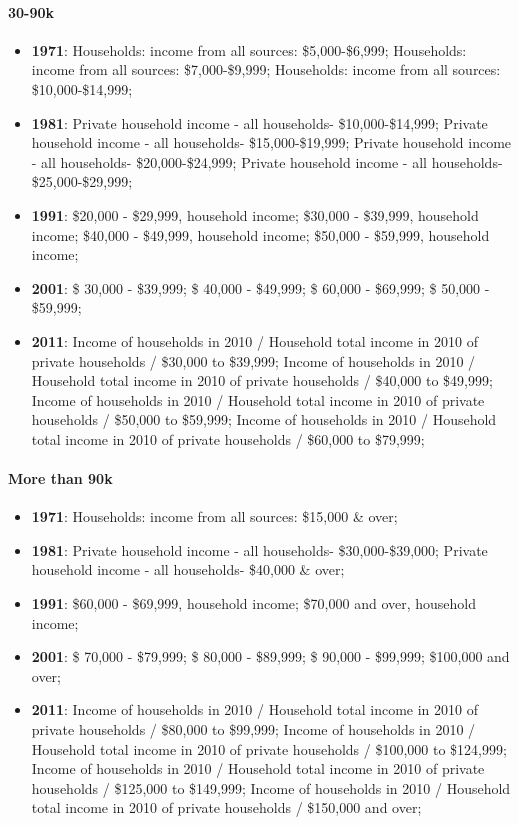 \documentclass[a4paper]{article}
\begin{document}
\paragraph{30-90k}
\begin{itemize}
   \item{\textbf{1971}:  Households: income from all sources: \$5,000-\$6,999; Households: income from all sources: \$7,000-\$9,999; Households: income from all sources: \$10,000-\$14,999;}
   \item{\textbf{1981}:  Private household income - all households- \$10,000-\$14,999; Private household income - all households- \$15,000-\$19,999; Private household income - all households- \$20,000-\$24,999; Private household income - all households- \$25,000-\$29,999;}
   \item{\textbf{1991}:  \$20,000 - \$29,999, household income; \$30,000 - \$39,999, household income; \$40,000 - \$49,999, household income; \$50,000 - \$59,999, household income;}
   \item{\textbf{2001}:  \$ 30,000 - \$39,999; \$ 40,000 - \$49,999; \$ 60,000 - \$69,999; \$ 50,000 - \$59,999;}
   \item{\textbf{2011}:  Income of households in 2010 / Household total income in 2010 of private households / \$30,000 to \$39,999; Income of households in 2010 / Household total income in 2010 of private households / \$40,000 to \$49,999; Income of households in 2010 / Household total income in 2010 of private households / \$50,000 to \$59,999; Income of households in 2010 / Household total income in 2010 of private households / \$60,000 to \$79,999;}
\end{itemize}

\paragraph{More than 90k}
\begin{itemize}
   \item{\textbf{1971}:  Households: income from all sources: \$15,000 \& over;}
   \item{\textbf{1981}:  Private household income - all households- \$30,000-\$39,000; Private household income - all households- \$40,000 \& over;}
   \item{\textbf{1991}:  \$60,000 - \$69,999, household income; \$70,000 and over, household income;}
   \item{\textbf{2001}:  \$ 70,000 - \$79,999; \$ 80,000 - \$89,999; \$ 90,000 - \$99,999; \$100,000 and over;}
   \item{\textbf{2011}:  Income of households in 2010 / Household total income in 2010 of private households / \$80,000 to \$99,999; Income of households in 2010 / Household total income in 2010 of private households / \$100,000 to \$124,999; Income of households in 2010 / Household total income in 2010 of private households / \$125,000 to \$149,999; Income of households in 2010 / Household total income in 2010 of private households / \$150,000 and over;}
\end{itemize}
\end{document}
